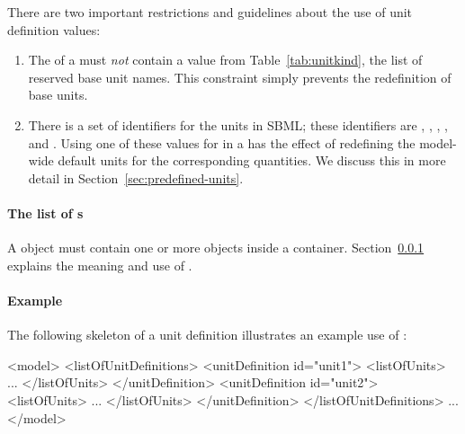 There are two important restrictions and guidelines about the use
of unit definition  values:
\begin{enumerate}
  
\item The  of a \UnitDefinition must \emph{not} contain
  a value from Table~\ref{tab:unitkind}, the list of
    reserved base unit names.  This constraint simply prevents
  the redefinition of base units.

\item There is a set of  identifiers for the
   units in SBML; these identifiers are ,
  , , , and .  Using
  one of these values for  in a \UnitDefinition has the
  effect of redefining the model-wide default units for the
  corresponding quantities.  We discuss this in more detail in
  Section~\ref{sec:predefined-units}.

\end{enumerate}


\paragraph{The list of s}
\label{sec:listofunits}

A \UnitDefinition object must contain one or more \Unit objects
inside a \ListOfUnits container.
Section~\ref{sec:unit-structure} explains the meaning and use of
\Unit.


\paragraph{Example}

The following skeleton of a unit definition illustrates an example
use of \UnitDefinition:

\begin{example}
<model>
    <listOfUnitDefinitions>
        <unitDefinition id="unit1">
            <listOfUnits>
                ...
            </listOfUnits>
        </unitDefinition>
        <unitDefinition id="unit2">
            <listOfUnits>
                ...
            </listOfUnits>
        </unitDefinition>
    </listOfUnitDefinitions>
    ...
</model>
\end{example}


\subsubsection{}
\label{sec:unit-structure}

